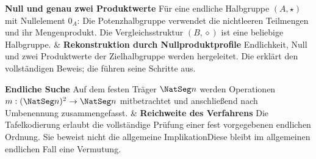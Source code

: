 \begin{BandUebersicht}
\textbf{Null und genau zwei Produktwerte}
Für eine endliche Halbgruppe \((A,\star)\) mit Nullelement \(0_A\):
Die Potenzhalbgruppe verwendet die nichtleeren Teilmengen und ihr
Mengenprodukt. Die Vergleichsstruktur \((B,\diamond)\) ist eine beliebige
Halbgruppe.
&
\textbf{Rekonstruktion durch Nullproduktprofile}
Endlichkeit, Null und zwei Produktwerte der Zielhalbgruppe werden
hergeleitet. Die \NullproductsReadingLink{} erklärt den vollständigen
Beweis; die \NullproductsProofsLink{} führen seine Schritte aus.
 \\
\addlinespace[.8ex]

\textbf{Endliche Suche}
Auf dem festen Träger \(\NatSeg n\) werden Operationen
\(m:(\NatSeg n)^2\to\NatSeg n\) mitbetrachtet und anschließend nach Umbenennung zusammengefasst.
&
\textbf{Reichweite des Verfahrens}
Die Tafelkodierung erlaubt die vollständige Prüfung einer fest
vorgegebenen endlichen Ordnung. Sie beweist nicht die allgemeine
ImplikationDiese bleibt im allgemeinen endlichen Fall eine Vermutung.
 \\
\addlinespace[.8ex]
\end{BandUebersicht}
